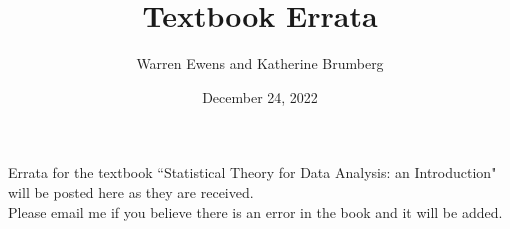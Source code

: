 \documentclass{article}
\title{Textbook Errata}
\author{Warren Ewens and Katherine Brumberg}
\date{December 24, 2022}
\begin{document}
\maketitle

\noindent Errata for the textbook ``Statistical Theory for Data Analysis: an Introduction" will be posted here as they are received. \\

\noindent Please email me if you believe there is an error in the book and it will be added.
\end{document}
